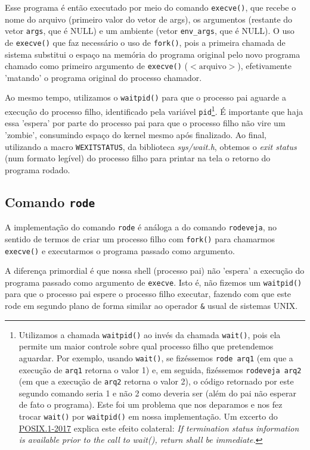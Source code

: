 \documentclass[a4paper, 12pt]{article}
\begin{document}
Esse programa é então executado por meio do comando \texttt{execve()}, que recebe o nome do arquivo (primeiro valor do vetor de args), os argumentos (restante do vetor \texttt{args}, que é NULL) e um ambiente (vetor \texttt{env\_args}, que é NULL). O uso de \texttt{execve()} que faz necessário o uso de \texttt{fork()}, pois a primeira chamada de sistema substitui o espaço na memória do programa original pelo novo programa chamado como primeiro argumento de \texttt{execve()} ($<\textrm{arquivo}>$), efetivamente 'matando' o programa original do processo chamador.

Ao mesmo tempo, utilizamos o \texttt{waitpid()} para que o processo pai aguarde a execução do processo filho, identificado pela variável \texttt{pid}\footnote{Utilizamos a chamada \texttt{waitpid()} ao invés da chamada \texttt{wait()}, pois ela permite um maior controle sobre qual processo filho que pretendemos aguardar. Por exemplo, usando \texttt{wait()}, se fizéssemos \texttt{rode arq1} (em que a execução de \texttt{arq1} retorna o valor 1) e, em seguida, fizéssemos \texttt{rodeveja arq2} (em que a execução de \texttt{arq2} retorna o valor 2), o código retornado por este segundo comando seria 1 e não 2 como deveria ser (além do pai não esperar de fato o programa). Este foi um problema que nos deparamos e nos fez trocar \texttt{wait()} por \texttt{waitpid()} em nossa implementação. Um excerto do \href{https://pubs.opengroup.org/onlinepubs/9699919799/functions/waitpid.html}{POSIX.1-2017} explica este efeito colateral:
\textit{If termination status information is available prior to the call to wait(), return shall be immediate.}}. É importante que haja essa 'espera' por parte do processo pai para que o processo filho não vire um 'zombie', consumindo espaço do kernel mesmo após finalizado. Ao final, utilizando a macro \texttt{WEXITSTATUS}, da biblioteca \textit{sys/wait.h}, obtemos o \textit{exit status} (num formato legível) do processo filho para printar na tela o retorno do programa rodado.

\subsection{Comando \texttt{rode}}

A implementação do comando \texttt{rode} é análoga a do comando \texttt{rodeveja}, no sentido de termos de criar um processo filho com \texttt{fork()} para chamarmos \texttt{execve()} e executarmos o programa passado como argumento.

A diferença primordial é que nossa shell (processo pai) não 'espera' a execução do programa passado como argumento de \texttt{execve}. Isto é, não fizemos um \texttt{waitpid()} para que o processo pai espere o processo filho executar, fazendo com que este rode em segundo plano de forma similar ao operador \texttt{\&} usual de sistemas UNIX.
\end{document}
